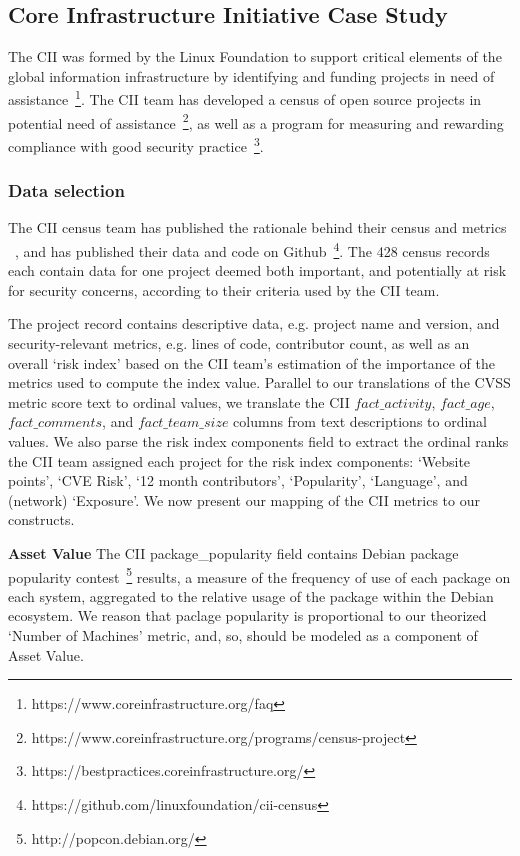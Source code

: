 \subsection{Core Infrastructure Initiative Case Study}
The CII was formed by the Linux Foundation to support critical elements of the global information infrastructure by identifying and funding projects in need of assistance~\footnote{https://www.coreinfrastructure.org/faq}. The CII team has developed a census of open source projects in potential need of assistance~\footnote{https://www.coreinfrastructure.org/programs/census-project}, as well as a program for measuring and rewarding compliance with good security practice~\footnote{https://bestpractices.coreinfrastructure.org/}.

\subsubsection{Data selection}
\label{sec:cii_selection}
The CII census team has published the rationale behind their census and metrics ~\cite{wheeler2015open}, and has published their data and code on Github~\footnote{https://github.com/linuxfoundation/cii-census}. The 428 census records each contain data for one project deemed both important, and potentially at risk for security concerns, according to their criteria used by the CII team.

The project record contains descriptive data, e.g. project name and version, and security-relevant metrics, e.g. lines of code, contributor count, as well as an overall `risk index' based on the CII team's estimation of the importance of the metrics used to compute the index value.  Parallel to our translations of the CVSS metric score text to ordinal values, we translate the CII $fact\_activity$, $fact\_age$, $fact\_comments$, and $fact\_team\_size$ columns from text descriptions to ordinal values. We also parse the risk index components field to extract the ordinal ranks the CII team assigned each project for the risk index components: `Website points', `CVE Risk', `12 month contributors', `Popularity', `Language', and (network) `Exposure'. We now present our mapping of the CII metrics to our constructs.

\textbf{Asset Value}
The CII package\_popularity field contains Debian package popularity contest~\footnote{http://popcon.debian.org/} results, a measure of the frequency of use of each package on each system, aggregated to the relative usage of the package within the Debian ecosystem. We reason that paclage popularity is proportional to our theorized `Number of Machines'  metric, and, so, should be modeled as a component of Asset Value.

